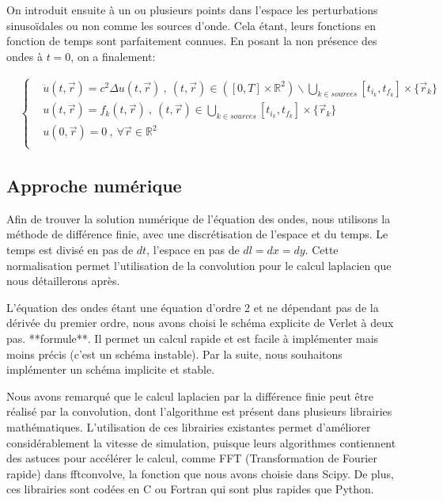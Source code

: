 \documentclass[11pt, a4paper]{article}
\begin{document}
On introduit ensuite à un ou plusieurs points dans l'espace les perturbations sinusoïdales ou non comme les sources d'onde. Cela étant, leurs fonctions en fonction de temps sont parfaitement connues. En posant la non présence des ondes à $t=0$, on a finalement:

\begin{align*}
     & \left\{
    \begin{aligned}
         & \ddot{u}(t,\vec{r})=c^2\Delta u(t,\vec{r})\ ,\ (t,\vec{r})\in ([0,T]\times\mathbb{R}^2)\backslash\bigcup\limits_{k\in sources}[t_{i_k},t_{f_k}]\times\{\vec{r}_k\} \\
         & u(t,\vec{r})=f_k(t,\vec{r})\ ,\ (t,\vec{r})\in\bigcup\limits_{k\in sources}[t_{i_k},t_{f_k}]\times\{\vec{r}_k\}                                                    \\
         & u(0,\vec{r})=0\ ,\ \forall\vec{r}\in\mathbb{R}^2                                                                                                                   \\
    \end{aligned}
    \right.
\end{align*}

\subsection{Approche numérique}
Afin de trouver la solution numérique de l'équation des ondes, nous utilisons la méthode de différence finie, avec une discrétisation de l'espace et du temps. Le temps est divisé en pas de $dt$, l'espace en pas de $dl=dx=dy$. Cette normalisation permet l'utilisation de la convolution pour le calcul laplacien que nous détaillerons après.

L'équation des ondes étant une équation d'ordre 2 et ne dépendant pas de la dérivée du premier ordre, nous avons choisi le schéma explicite de Verlet à deux pas. **formule**. Il permet un calcul rapide et est facile à implémenter mais moins précis (c'est un schéma instable). Par la suite, nous souhaitons implémenter un schéma implicite et stable.

Nous avons remarqué que le calcul laplacien par la différence finie peut être réalisé par la convolution, dont l'algorithme est présent dans plusieurs librairies mathématiques. L'utilisation de ces librairies existantes permet d'améliorer considérablement la vitesse de simulation, puisque leurs algorithmes contiennent des astuces  pour accélérer le calcul, comme FFT (Transformation de Fourier rapide) dans fftconvolve, la fonction que nous avons choisie dans Scipy. De plus, ces librairies sont codées en C ou Fortran qui sont plus rapides que Python.
\end{document}

